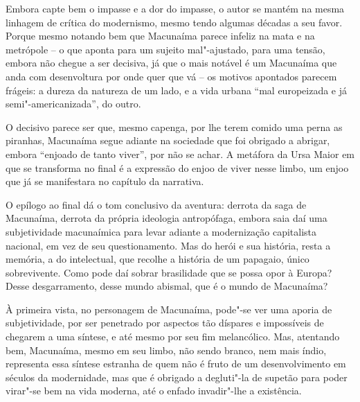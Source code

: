 {Embora capte bem o impasse e a dor do impasse, o autor se mantém na
mesma linhagem de crítica do modernismo, mesmo tendo algumas décadas a
seu favor. Porque mesmo notando bem que Macunaíma parece infeliz na mata
e na metrópole -- o que aponta para um sujeito mal"-ajustado, para uma
tensão, embora não chegue a ser decisiva, já que o mais notável é um
Macunaíma que anda com desenvoltura por onde quer que vá -- os motivos
apontados parecem frágeis: a dureza da natureza de um lado, e a vida
urbana ``mal europeizada e já semi"-americanizada'', do outro.

O decisivo parece ser que, mesmo capenga, por lhe terem comido uma perna
as piranhas, Macunaíma segue adiante na sociedade que foi obrigado a
abrigar, embora ``enjoado de tanto viver'', por não se achar. A metáfora
da Ursa Maior em que se transforma no final é a expressão do enjoo de
viver nesse limbo, um enjoo que já se manifestara no capítulo  da
narrativa.

O epílogo ao final dá o tom conclusivo da aventura: derrota da saga de
Macunaíma, derrota da própria ideologia antropófaga, embora saia daí uma
subjetividade macunaímica para levar adiante a modernização capitalista
nacional, em vez de seu questionamento. Mas do herói e sua história,
resta a memória, a do intelectual, que recolhe a história de um
papagaio, único sobrevivente. Como pode daí sobrar brasilidade que se
possa opor à Europa? Desse desgarramento, desse mundo abismal, que é o
mundo de Macunaíma?

À primeira vista, no personagem de Macunaíma, pode"-se ver uma aporia de
subjetividade, por ser penetrado por aspectos tão díspares e impossíveis
de chegarem a uma síntese, e até mesmo por seu fim melancólico. Mas,
atentando bem, Macunaíma, mesmo em seu limbo, não sendo branco, nem mais
índio, representa essa síntese estranha de quem não é fruto de um
desenvolvimento em séculos da modernidade, mas que é obrigado a
degluti"-la de supetão para poder virar"-se bem na vida moderna, até o
enfado invadir"-lhe a existência.

}
